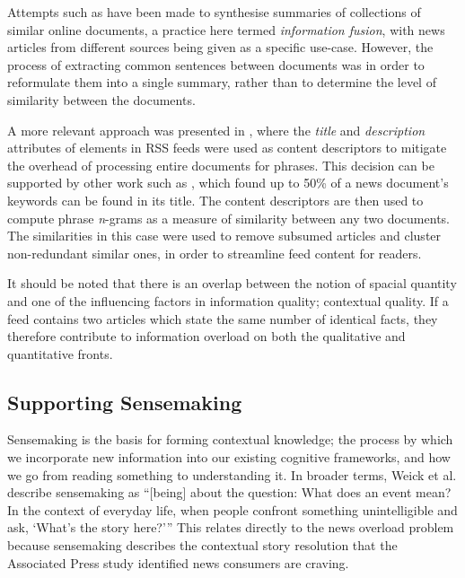 Attempts such as \citep{InformationFusionInTheContextOfMultiDocumentSummarization} have been made to synthesise summaries of collections of similar online documents, a practice here termed \textit{information fusion}, with news articles from different sources being given as a specific use-case. However, the process of extracting common sentences between documents was in order to reformulate them into a single summary, rather than to determine the level of similarity between the documents.

A more relevant approach was presented in \citep{UtilizingPhraseSimilarityMeasures}, where the \textit{title} and \textit{description} attributes of elements in RSS feeds were used as content descriptors to mitigate the overhead of processing entire documents for phrases. This decision can be supported by other work such as \citep{IdentifyingTopicsByPosition}, which found up to 50\% of a news document's keywords can be found in its title. The content descriptors are then used to compute phrase \textit{n}-grams as a measure of similarity between any two documents. The similarities in this case were used to remove subsumed articles and cluster non-redundant similar ones, in order to streamline feed content for readers.

It should be noted that there is an overlap between the notion of spacial quantity and one of the influencing factors in information quality; contextual quality. If a feed contains two articles which state the same number of identical facts, they therefore contribute to information overload on both the qualitative and quantitative fronts.


\subsection{Supporting Sensemaking}

Sensemaking is the basis for forming contextual knowledge; the process by which we incorporate new information into our existing cognitive frameworks, and how we go from reading something to understanding it. \citep{FromInformationToKnowing} In broader terms, Weick et al. describe sensemaking as ``[being] about the question: What does an event mean? In the context of everyday life, when people confront something unintelligible and ask, `What’s the story here?'{}'' \citep[p.85]{OrganizingAndTheProcessOfSensemaking} This relates directly to the news overload problem because sensemaking describes the contextual story resolution that the Associated Press study \citep{anewmodelfornews} identified news consumers are craving.

